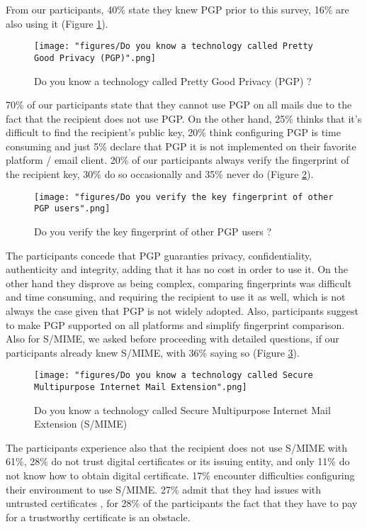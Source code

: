 From our participants, 40\% state they knew PGP prior to this survey, 16\% are also using it (Figure \ref{fig:pgp}).
\begin{figure}
	\texttt{[image: "figures/Do you know a technology called Pretty Good Privacy (PGP)".png]}
	\centering
	\caption{Do you know a technology called Pretty Good Privacy (PGP) ?}
	\label{fig:pgp}
\end{figure}
70\% of our participants state that they cannot use PGP on all mails due to the fact that the recipient does not use PGP. On the other hand, 25\% thinks that it's difficult to find the recipient's public key, 20\% think configuring PGP is time consuming and just 5\% declare that PGP it is not implemented on their favorite platform / email client. 20\% of our participants always verify the fingerprint of the recipient key, 30\% do so occasionally and 35\% never do (Figure \ref{fig:fingerprintpgp}).
\newline
\newline
\begin{figure}
	\texttt{[image: "figures/Do you verify the key fingerprint of other PGP users".png]}
	\centering
	\caption{Do you verify the key fingerprint of other PGP users ?}
	\label{fig:fingerprintpgp}
\end{figure}
The participants concede that PGP guaranties privacy, confidentiality, authenticity and integrity, adding that it has no cost in order to use it. On the other hand they disprove as being complex, comparing fingerprints was difficult and time consuming, and requiring the recipient to use it as well, which is not always the case given that PGP is not widely adopted.
Also, participants suggest to make PGP supported on all platforms and simplify fingerprint comparison.
\newline
Also for S/MIME, we asked before proceeding with detailed questions, if our participants already knew S/MIME, with 36\% saying so (Figure \ref{fig:s/mime}).
\newline
\newline
\begin{figure}
	\texttt{[image: "figures/Do you know a technology called Secure Multipurpose Internet Mail Extension".png]}
	\centering
	\caption{Do you know a technology called Secure Multipurpose Internet Mail Extension (S/MIME)}
	\label{fig:s/mime}
\end{figure}
The participants experience also that the recipient does not use S/MIME with 61\%, 28\% do not trust digital certificates or its issuing entity, and only 11\% do not know how to obtain digital certificate. 17\% encounter difficulties configuring their environment to use S/MIME. 27\% admit that they had issues with untrusted certificates , for 28\% of the participants the fact that they have to pay for a trustworthy certificate is an obstacle.
